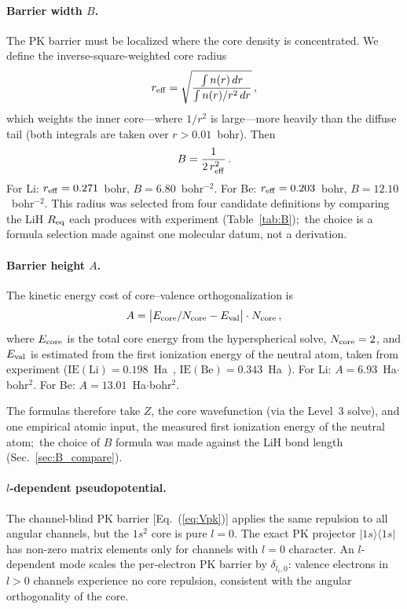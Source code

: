 \documentclass[aps,pra,twocolumn,superscriptaddress,longbibliography,floatfix]{revtex4-2}
\begin{document}
\paragraph{Barrier width $B$.}
The PK barrier must be localized where the core density is concentrated.
We define the inverse-square-weighted core radius
\begin{equation}
  r_{\rm eff} = \sqrt{\frac{\int n(r)\,dr}
    {\int n(r)/r^2\,dr}}\,,
  \label{eq:reff}
\end{equation}
which weights the inner core---where $1/r^2$ is large---more heavily
than the diffuse tail (both integrals are taken over $r > 0.01$~bohr).  Then
\begin{equation}
  B = \frac{1}{2\,r_{\rm eff}^2}\,.
  \label{eq:B}
\end{equation}
For Li: $r_{\rm eff} = 0.271$~bohr, $B = 6.80$~bohr$^{-2}$.
For Be: $r_{\rm eff} = 0.203$~bohr, $B = 12.10$~bohr$^{-2}$.
This radius was selected from four candidate definitions by comparing
the LiH $R_{\rm eq}$ each produces with experiment (Table~\ref{tab:B});\
the choice is a formula selection made against one molecular datum, not
a derivation.

\paragraph{Barrier height $A$.}
The kinetic energy cost of core--valence orthogonalization is
\begin{equation}
  A = \bigl|E_{\rm core}/N_{\rm core} - E_{\rm val}\bigr|
      \cdot N_{\rm core}\,,
  \label{eq:A}
\end{equation}
where $E_{\rm core}$ is the total core energy from the hyperspherical
solve, $N_{\rm core} = 2$, and $E_{\rm val}$ is estimated from the
first ionization energy of the neutral atom, taken from experiment
($\text{IE}(\text{Li}) = 0.198$~Ha~\cite{nist},
$\text{IE}(\text{Be}) = 0.343$~Ha~\cite{nist}).
For Li: $A = 6.93$~Ha$\cdot$bohr$^2$.
For Be: $A = 13.01$~Ha$\cdot$bohr$^2$.

The formulas therefore take $Z$, the core wavefunction (via the
Level~3 solve), and one empirical atomic input, the measured first
ionization energy of the neutral atom;\ the choice of $B$ formula was
made against the LiH bond length (Sec.~\ref{sec:B_compare}).

\paragraph{$l$-dependent pseudopotential.}
The channel-blind PK barrier [Eq.~(\ref{eq:Vpk})] applies the
same repulsion to all angular channels, but the $1s^2$ core is
pure $l = 0$.  The exact PK projector $|1s\rangle\langle 1s|$ has
non-zero matrix elements only for channels with $l = 0$ character.
An $l$-dependent mode scales the per-electron PK barrier by
$\delta_{l_i, 0}$: valence electrons in $l > 0$ channels
experience no core repulsion, consistent with the angular
orthogonality of the core.
\end{document}
